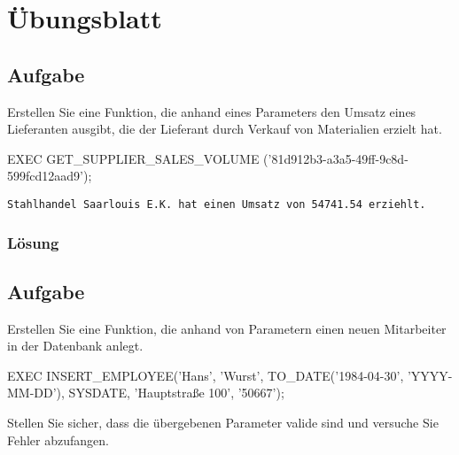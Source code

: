 \section{Übungsblatt}
\label{sec:uebung_07}

\subsection{Aufgabe}
\label{sec:uebung_07.aufgabe_01}
Erstellen Sie eine Funktion, die anhand eines Parameters den Umsatz eines Lieferanten ausgibt, die der Lieferant durch Verkauf von Materialien erzielt hat.

\begin{example-popup}
  \begin{sqlcode}
    EXEC GET_SUPPLIER_SALES_VOLUME ('81d912b3-a3a5-49ff-9c8d-599fcd12aad9');
  \end{sqlcode}
  \texttt{Stahlhandel Saarlouis E.K. hat einen Umsatz von 54741.54 erziehlt.}
\end{example-popup}

\subsubsection*{Lösung}
\label{sec:uebung_07.aufgabe_01.loesung}

\subsection{Aufgabe}
\label{sec:uebung_07.aufgabe_02}
Erstellen Sie eine Funktion, die anhand von Parametern einen neuen Mitarbeiter in der Datenbank anlegt.

\begin{example-popup}
  \begin{sqlcode}
    EXEC INSERT_EMPLOYEE('Hans', 'Wurst', TO_DATE('1984-04-30', 'YYYY-MM-DD'), SYSDATE, 'Hauptstraße 100', '50667');
  \end{sqlcode}
\end{example-popup}

Stellen Sie sicher, dass die übergebenen Parameter valide sind und versuche Sie Fehler abzufangen.

